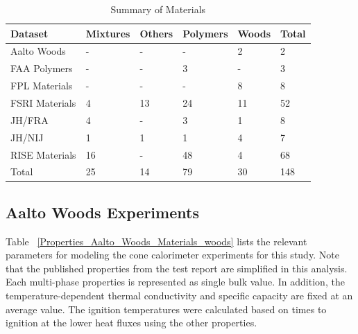 \begin{table}[!h]
\caption[Summary of Materials]{Summary of Materials}
\centering
\begin{tabular}{|l|p{1.6cm}|p{1.6cm}|p{1.6cm}|p{1.6cm}|p{1.6cm}|}
\hline
Dataset & Mixtures & Others & Polymers & Woods & Total \\ \hline
Aalto Woods    & - & - & - & 2 & 2 \\ \hline
FAA Polymers   & - & - & 3 & - & 3 \\ \hline
FPL Materials  & - & - & - & 8 & 8 \\ \hline
FSRI Materials & 4 & 13 & 24 & 11 & 52 \\ \hline
JH/FRA         & 4 & - & 3 & 1 & 8 \\ \hline
JH/NIJ         & 1 & 1 & 1 & 4 & 7 \\ \hline
RISE Materials & 16 & - & 48 & 4 & 68 \\ \hline
Total & 25 & 14 & 79 & 30 & 148 \\ \hline
\end{tabular}
\label{Scaling_Pyrolysis_Materials}
\end{table}

\clearpage

\subsection{Aalto Woods Experiments}\label{sec_Aalto_Woods_Materials}

Table ~\ref{Properties_Aalto_Woods_Materials_woods} lists the relevant parameters for modeling the cone calorimeter experiments for this study.
Note that the published properties from the test report are simplified in this analysis. Each multi-phase properties is represented as single bulk value.
In addition, the temperature-dependent thermal conductivity and specific capacity are fixed at an average value.
The ignition temperatures were calculated based on times to ignition at the lower heat fluxes using the other properties.


